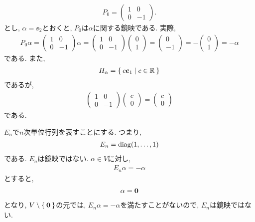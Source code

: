 \begin{example}
  \begin{align*}
    P_0=
    \begin{pmatrix}
      1 & 0 \\
      0 & -1 
    \end{pmatrix}.
  \end{align*}
  とし,
  $\alpha=\ee_2$とおくと,
  $P_0$は$\alpha$に関する鏡映である.
実際, 
\begin{align*}
  P_0\alpha = 
      \begin{pmatrix}
      1 & 0 \\
      0 & -1 
      \end{pmatrix}
      \alpha
    =
      \begin{pmatrix}
      1 & 0 \\
      0 & -1 
    \end{pmatrix}
    \begin{pmatrix}
      0  \\
      1  
    \end{pmatrix}
    =
    \begin{pmatrix}
      0  \\
      -1  
    \end{pmatrix}
    =
    -
    \begin{pmatrix}
      0  \\
      1  
    \end{pmatrix}
    =
    -\alpha
\end{align*}
である.  また,
\begin{align*}
  H_\alpha = \Set{c \boldsymbol{e}_1 | c\in \mathbb{R}}
\end{align*}
であるが,
\begin{align*}
    \begin{pmatrix}
      1 & 0 \\
      0 & -1 
    \end{pmatrix}
    \begin{pmatrix}
      c  \\
      0  
    \end{pmatrix}
    =
    \begin{pmatrix}
      c  \\
      0  
    \end{pmatrix}
\end{align*}
である.
\end{example}

\begin{example}
  $E_n$で$n$次単位行列を表すことにする.
  つまり,
  \begin{align*}
    E_n=\operatorname{diag}(1,\ldots,1)
  \end{align*}
  である. $E_n$は鏡映ではない.
  $\alpha\in V$に対し,
  \begin{align*}
    E_n\alpha=-\alpha
  \end{align*}
  とすると,
  \begin{align*}
    \alpha=\boldsymbol{0}
  \end{align*}
  となり, $V\setminus\Set{\boldsymbol{0}}$の元では,
  $E_n\alpha=-\alpha$を満たすことがないので,
  $E_n$は鏡映ではない.
\end{example}

